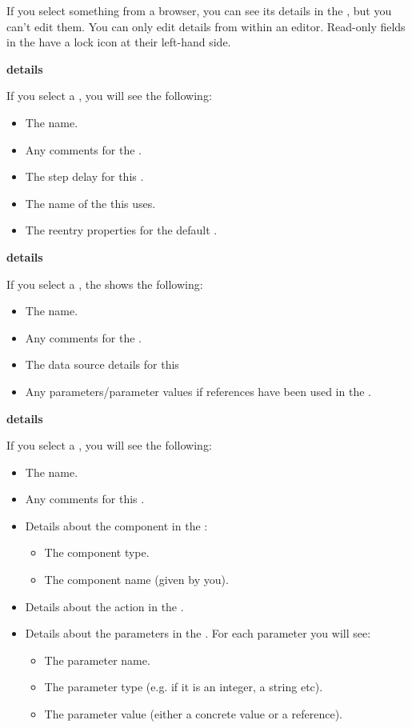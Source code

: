 If you select something from a browser, you can see its details in the \gdpropview{}, but you can't edit them. You can only edit details from within an editor. Read-only fields in the \gdpropview{} have a lock icon at their left-hand side. 

\textbf{\gdsuite{} details}

If you select a \gdsuite{}, you will see the following:
\begin{itemize}
\item The \gdsuite{} name.
\item Any comments for the \gdsuite{}. 
\item The step delay for this \gdsuite{}.
\item The name of the \gdaut{} this \gdsuite{} uses. 
\item The reentry properties for the default \gdehandlers{}. 
\end{itemize}

\textbf{\gdcase{} details}

If you select a \gdcase{}, the \gdpropview{} shows the following:

\begin{itemize}
\item The \gdcase{} name.
\item Any comments for the \gdcase{}. 
\item The data source details for this \gdcase{}
\item Any parameters/parameter values if references have been used in the \gdcase{}. 
\end{itemize}


\textbf{\gdstep{} details}

If you select a \gdstep{}, you will see the following:
\begin{itemize}
\item The \gdstep{} name.
\item Any comments for this \gdstep{}. 
\item Details about the component in the \gdstep{}:
\begin{itemize}
\item  The component type.
\item  The component name (given by you).
\end{itemize}
\item Details about the action in the \gdstep{}.
\item Details about the parameters in the \gdstep{}. For each parameter you will see:
\begin{itemize}
\item The parameter name.
\item The parameter type (e.g. if it is an integer, a string etc).
\item The parameter value (either a concrete value or a reference). 
\end{itemize}
\end{itemize}

